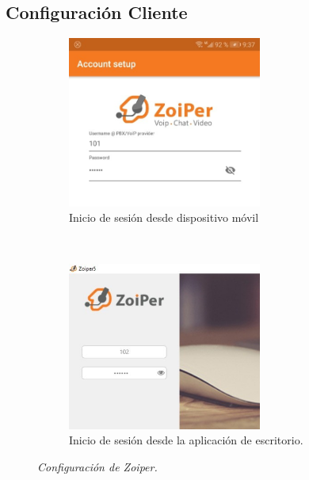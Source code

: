 \documentclass[conference]{IEEEtran}
\begin{document}
\subsection{Configuración Cliente}
\begin{figure}[h]
    \begin{subfigure}[h]{0.35\textwidth}
       \centerline{\includegraphics[width=0.7\textwidth]{img/metc01.jpeg}}
        \caption{Inicio de sesión desde dispositivo móvil}

    \end{subfigure}
    ~ %
     \begin{subfigure}[h]{0.35\textwidth}
        \centerline{\includegraphics[width=0.7\textwidth]{img/metc02.jpeg}}
        \caption{Inicio de sesión desde la aplicación de escritorio.}

    \end{subfigure}
    \caption{\textit{Configuración de Zoiper.}}
\label{fig:metc0}
\end{figure}
\end{document}
